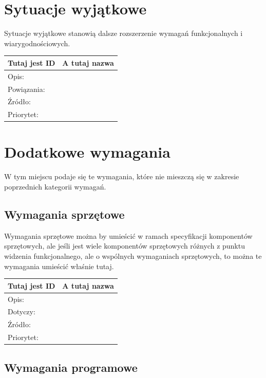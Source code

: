 \documentclass[a4paper,10pt]{article}
\begin{document}
\section{Sytuacje wyjątkowe}

Sytuacje wyjątkowe stanowią dalsze rozszerzenie wymagań funkcjonalnych i wiarygodnościowych.


\begin{tabular}{|p{3cm}|p{9cm}|} \hline

Tutaj jest ID & A tutaj nazwa \\ \hline
Opis: &  \\ \hline
Powiązania: &  \\ \hline
Źródło: &  \\ \hline
Priorytet: &  \\ \hline

\end{tabular}


\section{Dodatkowe wymagania}

W tym miejscu podaje się te wymagania, które nie mieszczą się w zakresie poprzednich kategorii wymagań.

\subsection{Wymagania sprzętowe}

Wymagania sprzętowe można by umieścić w ramach specyfikacji komponentów sprzętowych, ale jeśli jest wiele komponentów sprzętowych różnych z punktu widzenia funkcjonalnego, ale o wspólnych wymaganiach sprzętowych, to można te wymagania umieścić właśnie tutaj.


\begin{tabular}{|p{3cm}|p{9cm}|} \hline

Tutaj jest ID & A tutaj nazwa \\ \hline
Opis: &  \\ \hline
Dotyczy: &  \\ \hline
Źródło: &  \\ \hline
Priorytet: &  \\ \hline

\end{tabular}


\subsection{Wymagania programowe}
\end{document}
